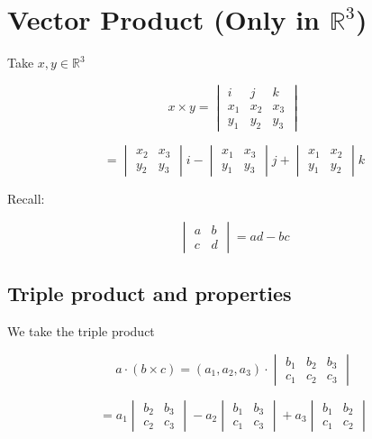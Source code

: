 \documentclass[11pt]{article}
\begin{document}
\section{Vector Product (Only in $\mathbb{R}^3$)}

Take $x, y \in \mathbb{R}^3$

\[
x \times y = \begin{vmatrix}
i & j & k \\
x_1 & x_2 & x_3 \\
y_1 & y_2 & y_3
\end{vmatrix}
\]

\[
= \begin{vmatrix}
x_2 & x_3 \\
y_2 & y_3
\end{vmatrix} i - \begin{vmatrix}
x_1 & x_3 \\
y_1 & y_3
\end{vmatrix} j + \begin{vmatrix}
x_1 & x_2 \\
y_1 & y_2
\end{vmatrix} k
\]

Recall:

\[
\begin{vmatrix}
a & b \\
c & d
\end{vmatrix} = ad - bc
\]

\subsection{Triple product and properties}

We take the triple product

\[
a \cdot (b \times c) = (a_1, a_2, a_3) \cdot \begin{vmatrix}
b_1 & b_2 & b_3 \\
c_1 & c_2 & c_3
\end{vmatrix}
\]

\[
= a_1 \begin{vmatrix}
b_2 & b_3 \\
c_2 & c_3
\end{vmatrix} - a_2 \begin{vmatrix}
b_1 & b_3 \\
c_1 & c_3
\end{vmatrix} + a_3 \begin{vmatrix}
b_1 & b_2 \\
c_1 & c_2
\end{vmatrix}
\]
\end{document}

